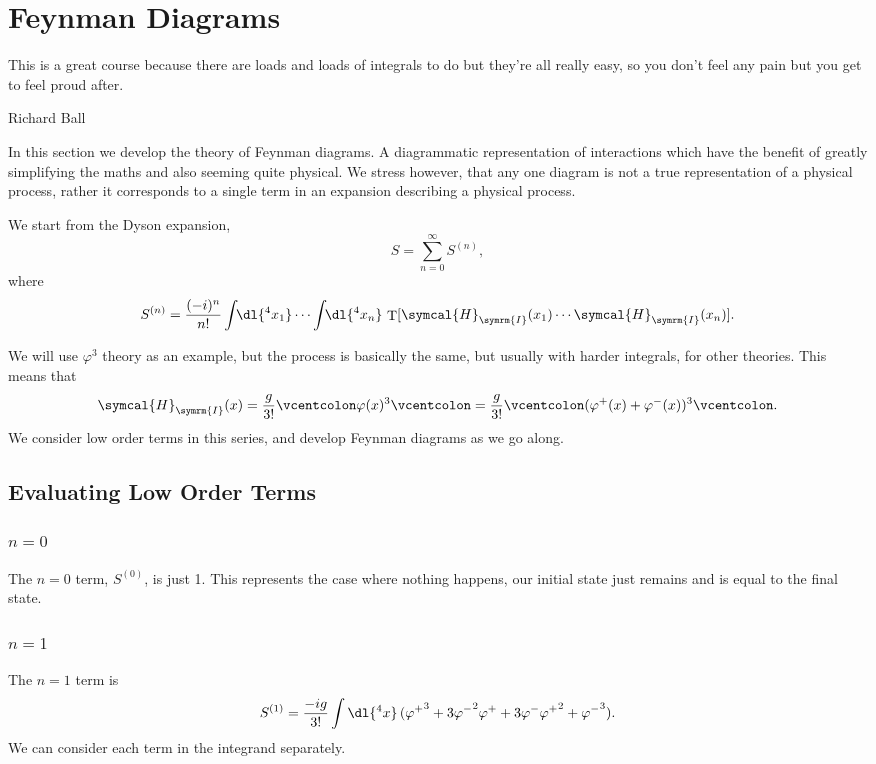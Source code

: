 \documentclass[fleqn]{NotesClass}
\newcommand{\hamiltonianDensity}{\symcal{H}}
\newcommand{\normalordering}[1]{\mathopen{\vcentcolon}{#1}\mathclose{\vcentcolon}}
\newcommand{\interaction}{\symrm{I}}
\DeclareMathOperator{\timeOrdering}{T}
\begin{document}
    \chapter{Feynman Diagrams}
    \epigraph{This is a great course because there are loads and loads of integrals to do but they're all really easy, so you don't feel any pain but you get to feel proud after.}{Richard Ball}
    In this section we develop the theory of Feynman diagrams.
    A diagrammatic representation of interactions which have the benefit of greatly simplifying the maths and also seeming quite physical.
    We stress however, that any one diagram is not a true representation of a physical process, rather it corresponds to a single term in an expansion describing a physical process.
    
    We start from the Dyson expansion,
    \begin{equation}
        S = \sum_{n = 0}^{\infty} S^{(n)},
    \end{equation}
    where
    \begin{equation}
        S^{(n)} = \frac{(-i)^n}{n!} \int \!\! \dl{^4x_1} \dotsm \int \!\! \dl{^4x_n} \, \timeOrdering[\hamiltonianDensity_{\interaction}(x_1) \dotsm \hamiltonianDensity_{\interaction}(x_n)].
    \end{equation}

    We will use \(\varphi^3\) theory as an example, but the process is basically the same, but usually with harder integrals, for other theories.
    This means that
    \begin{equation}
        \hamiltonianDensity_{\interaction}(x) = \frac{g}{3!} \normalordering{\varphi(x)^3} = \frac{g}{3!}\normalordering{(\varphi^+(x) + \varphi^-(x))^3}.
    \end{equation}
    We consider low order terms in this series, and develop Feynman diagrams as we go along.
    
    \section{Evaluating Low Order Terms}
    \subsection{\texorpdfstring{\(n = 0\)}{n = 0}}
    The \(n = 0\) term, \(S^{(0)}\), is just 1.
    This represents the case where nothing happens, our initial state just remains and is equal to the final state.
    
    \subsection{\texorpdfstring{\(n = 1\)}{n = 1}}
    The \(n = 1\) term is
    \begin{equation}
        S^{(1)} = \frac{-ig}{3!} \int \dl{^4x} \, ({\varphi^+}^3 + 3{\varphi^-}^2\varphi^+ + 3\varphi^-{\varphi^+}^2 + {\varphi^-}^3).
    \end{equation}
    We can consider each term in the integrand separately.
    
\end{document}
